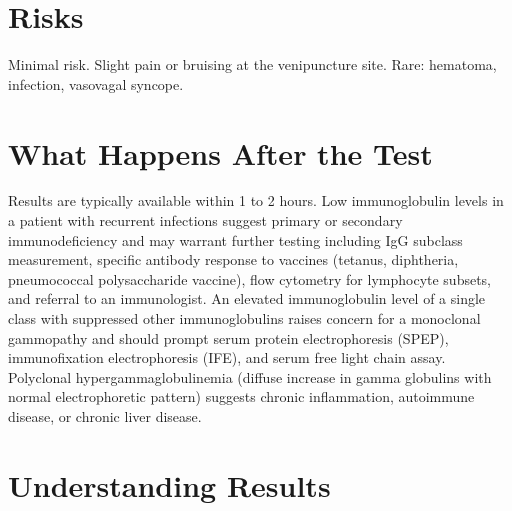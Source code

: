 \section*{Risks}
Minimal risk. Slight pain or bruising at the venipuncture site. Rare: hematoma, infection, vasovagal syncope.

\section*{What Happens After the Test}
Results are typically available within 1 to 2 hours. Low immunoglobulin levels in a patient with recurrent infections suggest primary or secondary immunodeficiency and may warrant further testing including IgG subclass measurement, specific antibody response to vaccines (tetanus, diphtheria, pneumococcal polysaccharide vaccine), flow cytometry for lymphocyte subsets, and referral to an immunologist. An elevated immunoglobulin level of a single class with suppressed other immunoglobulins raises concern for a monoclonal gammopathy and should prompt serum protein electrophoresis (SPEP), immunofixation electrophoresis (IFE), and serum free light chain assay. Polyclonal hypergammaglobulinemia (diffuse increase in gamma globulins with normal electrophoretic pattern) suggests chronic inflammation, autoimmune disease, or chronic liver disease.

\section*{Understanding Results}

